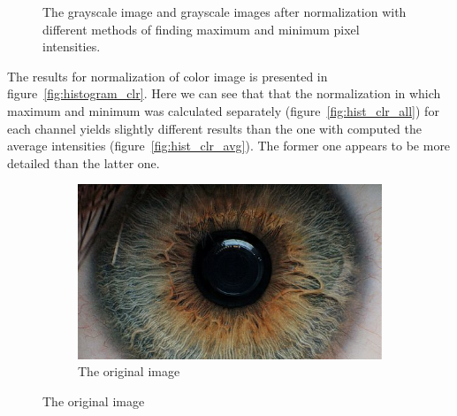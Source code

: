 \documentclass{article}
\begin{document}
\begin{figure}[H]
  \caption{The grayscale image and grayscale images after normalization with different methods of finding maximum and minimum pixel intensities.}
\vspace{-12pt}
  \label{fig:histogram_gray}
\end{figure}




The results for normalization of color image is presented in figure~\ref{fig:histogram_clr}.
Here we can see that that the normalization in which maximum and minimum was calculated separately (figure~\ref{fig:hist_clr_all}) for each channel yields slightly different results than the one with computed the average intensities (figure~\ref{fig:hist_clr_avg}).
The former one appears to be more detailed than the latter one.


\begin{figure}[H]
\centering

\begin{subfigure}[b]{0.5\linewidth}
\centering
  \includegraphics[width=0.9\linewidth]{res/index.jpg}
  \caption{The original image}
   \label{fig:hist_clr_org}
\end{subfigure}%


\end{figure}
\end{document}

